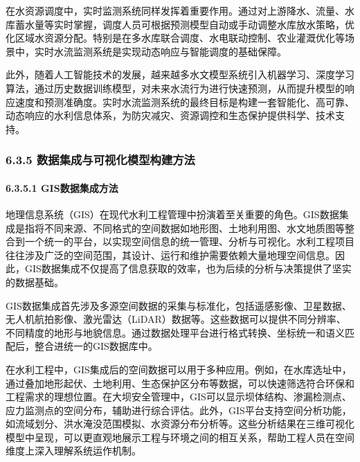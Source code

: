 在水资源调度中，实时监测系统同样发挥着重要作用。通过对上游降水、流量、水库蓄水量等实时掌握，调度人员可根据预测模型自动或手动调整水库放水策略，优化区域水资源分配。特别是在多水库联合调度、水电联动控制、农业灌溉优化等场景中，实时水流监测系统是实现动态响应与智能调度的基础保障。

此外，随着人工智能技术的发展，越来越多水文模型系统引入机器学习、深度学习算法，通过历史数据训练模型，对未来水流行为进行快速预测，从而提升模型的响应速度和预测准确度。实时水流监测系统的最终目标是构建一套智能化、高可靠、动态响应的水利信息体系，为防灾减灾、资源调控和生态保护提供科学、技术支持。

\hypertarget{ux6570ux636eux96c6ux6210ux4e0eux53efux89c6ux5316ux6a21ux578bux6784ux5efaux65b9ux6cd5}{%
\subsubsection{6.3.5 数据集成与可视化模型构建方法}\label{ux6570ux636eux96c6ux6210ux4e0eux53efux89c6ux5316ux6a21ux578bux6784ux5efaux65b9ux6cd5}}

\hypertarget{gisux6570ux636eux96c6ux6210ux65b9ux6cd5}{%
\paragraph{6.3.5.1 GIS数据集成方法}\label{gisux6570ux636eux96c6ux6210ux65b9ux6cd5}}

地理信息系统（GIS）在现代水利工程管理中扮演着至关重要的角色。GIS数据集成是指将不同来源、不同格式的空间数据如地形图、土地利用图、水文地质图等整合到一个统一的平台，以实现空间信息的统一管理、分析与可视化。水利工程项目往往涉及广泛的空间范围，其设计、运行和维护需要依赖大量地理空间信息。因此，GIS数据集成不仅提高了信息获取的效率，也为后续的分析与决策提供了坚实的数据基础。

GIS数据集成首先涉及多源空间数据的采集与标准化，包括遥感影像、卫星数据、无人机航拍影像、激光雷达（LiDAR）数据等。这些数据可以提供不同分辨率、不同精度的地形与地貌信息。通过数据处理平台进行格式转换、坐标统一和语义匹配后，整合进统一的GIS数据库中。

在水利工程中，GIS集成后的空间数据可以用于多种应用。例如，在水库选址中，通过叠加地形起伏、土地利用、生态保护区分布等数据，可以快速筛选符合环保和工程需求的理想位置。在大坝安全管理中，GIS可以显示坝体结构、渗漏检测点、应力监测点的空间分布，辅助进行综合评估。此外，GIS平台支持空间分析功能，如流域划分、洪水淹没范围模拟、水资源分布分析等。这些分析结果在三维可视化模型中呈现，可以更直观地展示工程与环境之间的相互关系，帮助工程人员在空间维度上深入理解系统运作机制。

